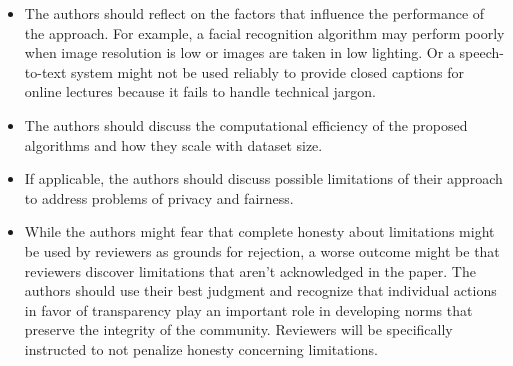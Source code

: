 \begin{enumerate}
\begin{itemize}
        \item The authors should reflect on the factors that influence the performance of the approach. For example, a facial recognition algorithm may perform poorly when image resolution is low or images are taken in low lighting. Or a speech-to-text system might not be used reliably to provide closed captions for online lectures because it fails to handle technical jargon.
        \item The authors should discuss the computational efficiency of the proposed algorithms and how they scale with dataset size.
        \item If applicable, the authors should discuss possible limitations of their approach to address problems of privacy and fairness.
        \item While the authors might fear that complete honesty about limitations might be used by reviewers as grounds for rejection, a worse outcome might be that reviewers discover limitations that aren't acknowledged in the paper. The authors should use their best judgment and recognize that individual actions in favor of transparency play an important role in developing norms that preserve the integrity of the community. Reviewers will be specifically instructed to not penalize honesty concerning limitations.
    \end{itemize}


\end{enumerate}
